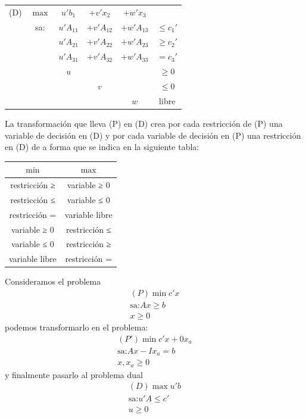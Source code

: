 \documentclass[PM.tex]{subfiles}
\begin{document}
\begin{center}
\begin{tabular}{cccccc}
(D) & $\max$ & $u'b_1$ & $+v'x_2$ & $+w'x_3$\\
    & sa: & $u'A_{11}$ & $+v'A_{12}$ & $+w'A_{13}$ & $≤ c_1'$\\
    &     & $u'A_{21}$ & $+v'A_{22}$ & $+w'A_{23}$ & $≥ c_2'$\\
    &     & $u'A_{31}$ & $+v'A_{32}$ & $+w'A_{33}$ & $= c_3'$\\
    &     &       $u$  &             &             & $≥ 0$\\
    &     &            &      $v$    &             & $≤ 0$\\
    &     &            &             &      $w$    & libre
\end{tabular}
\end{center}

La transformación que lleva (P) en (D) crea por cada restricción de (P) una variable de decisión en (D) y por cada variable de decisión en (P) una restricción en (D) de a forma que se indica en la siguiente tabla:

\begin{center}
\begin{tabular}{|c|c|}
\hline
	$\min$ & $\max$\\
\hline
	restricción ≥ & variable ≥ 0\\
\hline
	restricción ≤ & variable ≤ 0\\
\hline
	restricción = & variable libre\\
\hline
	variable ≥ 0 & restricción ≤\\
\hline
	variable ≤ 0 & restricción ≥\\
\hline
	variable libre & restricción = \\
\hline
\end{tabular}
\end{center}

\begin{example}
Consideramos el problema
\begin{align*}(P)
	\min c'x\\
	\text{sa:} Ax ≥ b\\
	x ≥ 0
\end{align*}
podemos transformarlo en el problema:
\begin{align*}(P')
	\min c'x + 0x_a\\
	\text{sa:} Ax-Ix_a = b\\
	x, x_a ≥ 0 
\end{align*}
y finalmente pasarlo al problema dual
\begin{align*}(D)
	\max u'b\\
	\text{sa:} u'A ≤ c'\\
	u ≥ 0
\end{align*}
\end{example}
\end{document}
